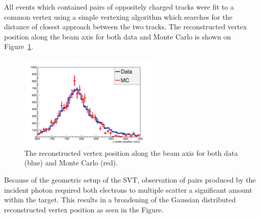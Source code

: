 All events which contained pairs of oppositely charged tracks were fit to a
common vertex using a simple vertexing algorithm which searches for the distance
of closest approach between the two tracks.  The reconstructed vertex position
along the beam axis for both data and Monte Carlo is shown on 
Figure~\ref{fig:vz_position}.
\begin{figure}[h]
    \begin{center}
    	\includegraphics[width=0.60\textwidth]{test2012/svtperformance/trk_performance/zvertex.pdf}
        \caption{  
                    The reconstructed vertex position along the beam axis for
                    both data (blue) and Monte Carlo (red).
                } 
	\label{fig:vz_position}
    \end{center}
\end{figure}
Because of the geometric setup of the SVT, observation of pairs produced by
the incident photon required both electrons to multiple scatter a significant 
amount within the target.  This results in a broadening of the Gaussian 
distributed reconstructed vertex position as seen in the Figure. 

